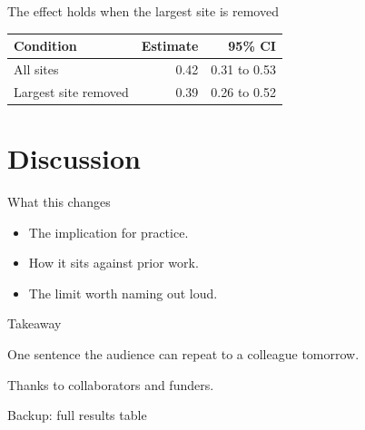 \documentclass[aspectratio=169]{beamer}
\begin{document}
\begin{frame}{The effect holds when the largest site is removed}
  \centering
  \begin{tabular}{lrr}
    \toprule
    Condition & Estimate & 95\% CI \\
    \midrule
    All sites & 0.42 & 0.31 to 0.53 \\
    Largest site removed & 0.39 & 0.26 to 0.52 \\
    \bottomrule
  \end{tabular}
\end{frame}

\section{Discussion}

\begin{frame}{What this changes}
  \begin{itemize}
    \item The implication for practice.
    \item How it sits against prior work.
    \item The limit worth naming out loud.
  \end{itemize}
\end{frame}

\begin{frame}{Takeaway}
  \begin{block}{}
    \large One sentence the audience can repeat to a colleague tomorrow.
  \end{block}
  \vfill
  {\footnotesize Thanks to collaborators and funders.}
\end{frame}

\appendix

\begin{frame}{Backup: full results table}
\end{frame}
\end{document}
